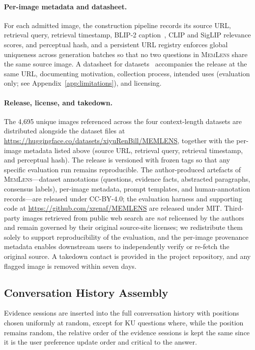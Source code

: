 \documentclass{llmxive}
\providecommand{\bench}{\textsc{MemLens}}
\begin{document}
\paragraph{Per-image metadata and datasheet.}
For each admitted image, the construction pipeline records its source URL, retrieval query, retrieval timestamp, BLIP-2 caption~\cite{li2023blip2}, CLIP and SigLIP relevance scores, and perceptual hash, and a persistent URL registry enforces global uniqueness across generation batches so that no two questions in \bench{} share the same source image. A datasheet for datasets~\citep{gebru2021datasheets} accompanies the release at the same URL, documenting motivation, collection process, intended uses (evaluation only; see Appendix~\ref{app:limitations}), and licensing.

\paragraph{Release, license, and takedown.}
The 4{,}695 unique images referenced across the four context-length datasets are distributed alongside the dataset files at \url{https://huggingface.co/datasets/xiyuRenBill/MEMLENS}, together with the per-image metadata listed above (source URL, retrieval query, retrieval timestamp, and perceptual hash). The release is versioned with frozen tags so that any specific evaluation run remains reproducible. The author-produced artefacts of \bench{}---dataset annotations (questions, evidence facts, abstracted paragraphs, consensus labels), per-image metadata, prompt templates, and human-annotation records---are released under CC-BY-4.0; the evaluation harness and supporting code at \url{https://github.com/xrenaf/MEMLENS} are released under MIT. Third-party images retrieved from public web search are \emph{not} relicensed by the authors and remain governed by their original source-site licenses; we redistribute them solely to support reproducibility of the evaluation, and the per-image provenance metadata enables downstream users to independently verify or re-fetch the original source. A takedown contact is provided in the project repository, and any flagged image is removed within seven days.

\subsection{Conversation History Assembly}
\label{app:history_assembly}

Evidence sessions are inserted into the full conversation history with positions chosen uniformly at random, except for KU questions where, while the position remains random, the relative order of the evidence sessions is kept the same since it is the user preference update order and critical to the answer.
\end{document}
